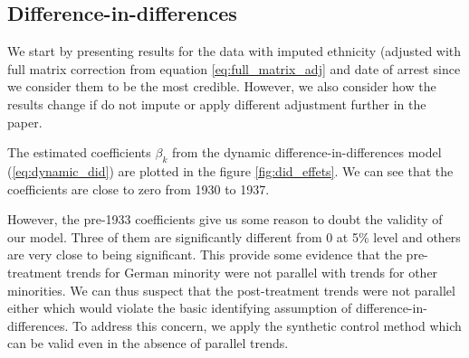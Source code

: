 \subsection{Difference-in-differences}
We start by presenting results for the data with imputed ethnicity (adjusted with full matrix correction from equation \ref{eq:full_matrix_adj} and date of arrest since we consider them to be the most credible. However, we also consider how the results change if do not impute or apply different adjustment further in the paper. 

 The estimated coefficients  $\beta_k$ from the dynamic difference-in-differences model (\ref{eq:dynamic_did}) are plotted in the figure \ref{fig:did_effets}. 
 We can see that the coefficients are close to zero from 1930 to 1937. 
 

However, the pre-1933 coefficients give us some reason to doubt the
validity of our model. Three of them are significantly different from 0 at 5\% level and others are very close to being significant. 
This provide some evidence that the pre-treatment trends for German minority were not parallel with trends for other minorities. We can thus suspect that the post-treatment trends were not parallel either which
would violate the basic identifying assumption of
difference-in-differences. To address this concern, we apply the synthetic control method which can be valid even in the absence of  parallel trends. 

